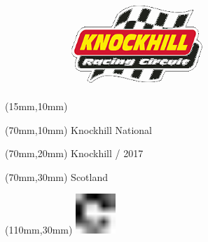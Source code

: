 \null\newpage
\begin{textblock*}{50mm}(15mm,10mm)%
\includegraphics[width=50mm]{LG/KNO.png}
\end{textblock*}
\begin{textblock*}{130mm}(70mm,10mm)%
{\fontsize{20}{20}\selectfont Knockhill National}\\
\end{textblock*}
\begin{textblock*}{120mm}(70mm,20mm)%
{\fontsize{16}{16}\selectfont Knockhill / 2017}\\
\end{textblock*}
\begin{textblock*}{120mm}(70mm,30mm)%
{\fontsize{12}{12}\selectfont Scotland}
\end{textblock*}
\begin{textblock*}{30mm}(110mm,30mm)%
\centering
\includegraphics[height=15mm]{icons/fa-rotate-right.pdf}
\end{textblock*}

